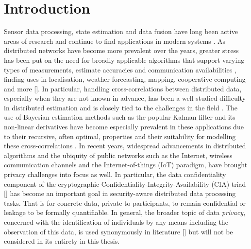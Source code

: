 
\chapter{Introduction}\label{ch:intro}
Sensor data processing, state estimation and data fusion have long been active areas of research and continue to find applications in modern systems \cite{andersonOptimalFiltering1979,simonOptimalStateEstimation2006}. As distributed networks have become more prevalent over the years, greater stress has been put on the need for broadly applicable algorithms that support varying types of measurements, estimate accuracies and communication availabilities \cite{mutambaraDecentralizedEstimationControl1998,ligginsDistributedDataFusion2012}, finding uses in localisation, weather forecasting, mapping, cooperative computing and more []. In particular, handling cross-correlations between distributed data, especially when they are not known in advance, has been a well-studied difficulty in distributed estimation and is closely tied to the challenges in the field \cite{noackTreatmentDependentInformation2017}. The use of Bayesian estimation methods such as the popular Kalman filter and its non-linear derivatives have become especially prevalent in these applications due to their recursive, often optimal, properties and their suitability for modelling these cross-correlations \cite{chongFortyYearsDistributed2017,haugBayesianEstimationTracking2012}. In recent years, widespread advancements in distributed algorithms and the ubiquity of public networks such as the Internet, wireless communication channels and the Internet-of-things (IoT) paradigm, have brought privacy challenges into focus as well\cite{brennerSecretProgramExecution2011,renSecurityChallengesPublic2012}. In particular, the data confidentiality component of the cryptographic Confidentiality-Integrity-Availability (CIA) triad [] has become an important goal in security-aware distributed data processing tasks. That is for concrete data, private to participants, to remain confidential or leakage to be formally quantifiable. In general, the broader topic of data \textit{privacy}, concerned with the identification of individuals by any means including the observation of this data, is used synonymously in literature [] but will not be considered in its entirety in this thesis.

